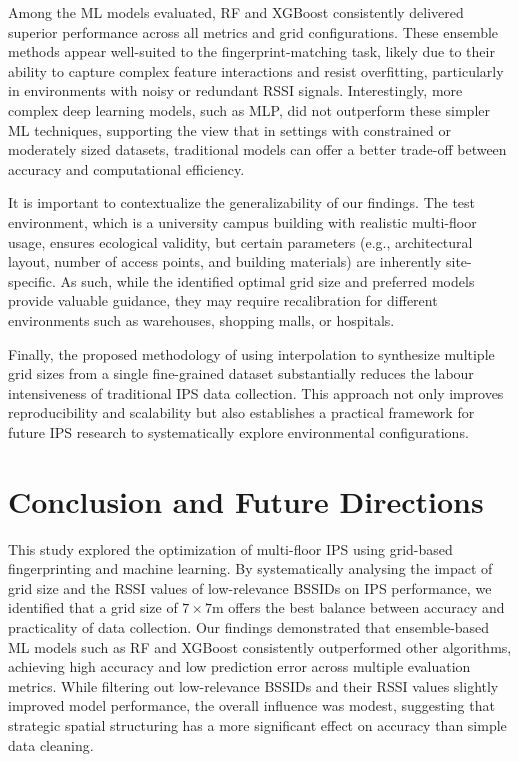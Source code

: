 \documentclass[runningheads]{llncs}
\begin{document}
Among the ML models evaluated, RF and XGBoost consistently delivered superior performance across all metrics and grid configurations. These ensemble methods appear well-suited to the fingerprint-matching task, likely due to their ability to capture complex feature interactions and resist overfitting, particularly in environments with noisy or redundant RSSI signals. Interestingly, more complex deep learning models, such as MLP, did not outperform these simpler ML techniques, supporting the view that in settings with constrained or moderately sized datasets, traditional models can offer a better trade-off between accuracy and computational efficiency.

It is important to contextualize the generalizability of our findings. The test environment, which is a university campus building with realistic multi-floor usage, ensures ecological validity, but certain parameters (e.g., architectural layout, number of access points, and building materials) are inherently site-specific. As such, while the identified optimal grid size and preferred models provide valuable guidance, they may require recalibration for different environments such as warehouses, shopping malls, or hospitals.

Finally, the proposed methodology of using interpolation to synthesize multiple grid sizes from a single fine-grained dataset substantially reduces the labour intensiveness of traditional IPS data collection. This approach not only improves reproducibility and scalability but also establishes a practical framework for future IPS research to systematically explore environmental configurations.

\section{Conclusion and Future Directions}\label{sec:conclusion}

This study explored the optimization of multi-floor IPS using grid-based fingerprinting and machine learning. By systematically analysing the impact of grid size and the RSSI values of low-relevance BSSIDs on IPS performance, we identified that a grid size of $7\times7$m offers the best balance between accuracy and practicality of data collection. Our findings demonstrated that ensemble-based ML models such as RF and XGBoost consistently outperformed other algorithms, achieving high accuracy and low prediction error across multiple evaluation metrics. While filtering out low-relevance BSSIDs and their RSSI values slightly improved model performance, the overall influence was modest, suggesting that strategic spatial structuring has a more significant effect on accuracy than simple data cleaning.
\end{document}
